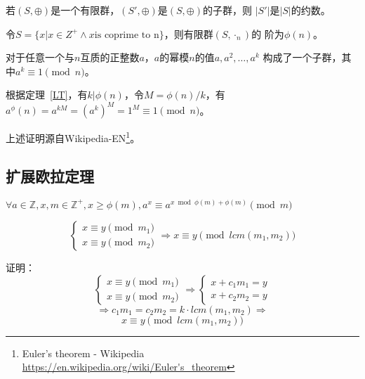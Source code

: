 \begin{theorem}\label{LT}
	若$(S,\oplus)$是一个有限群，$(S',\oplus)$是$(S,\oplus)$的子群，则
	$|S'|$是$|S|$的约数。
\end{theorem}

令$S=\{x|x\in Z^+ \land x \textrm{is coprime to n}\}$，则有限群$(S,\cdot_n)$的
阶为$\phi(n)$。

对于任意一个与$n$互质的正整数$a$，$a$的幂模$n$的值$a,a^2,\ldots,a^k$
构成了一个子群，其中$a^k\equiv 1 \pmod{n}$。

根据定理~\ref{LT}，有$k|\phi(n)$，令$M=\phi(n)/k$，有
$a^\phi(n)=a^{kM}=(a^k)^M=1^M\equiv 1 \pmod{n}$。

上述证明源自Wikipedia-EN\footnote{Euler's theorem - Wikipedia
	\url{https://en.wikipedia.org/wiki/Euler's_theorem}}。
\subsection{扩展欧拉定理}
\begin{theorem}\label{exEuler}
	$\forall a\in \mathbb{Z},x,m\in \mathbb{Z^+},x\geq \phi(m)
	,a^x\equiv a^{x \bmod \phi(m)+\phi(m)} \pmod{m}$
\end{theorem}

\begin{lemma}\label{EEL1}
	\begin{displaymath}
		\left\{
		\begin{array}{l}
			x\equiv y \pmod{m_1} \\
			x\equiv y \pmod{m_2}
		\end{array}
		\right.
		\Rightarrow x\equiv y \pmod{lcm(m_1,m_2)}
	\end{displaymath}
\end{lemma}

证明：
\begin{displaymath}
	\left\{
		\begin{array}{l}
			x\equiv y \pmod{m_1} \\
			x\equiv y \pmod{m_2}
		\end{array}
	\right.
	\Rightarrow
	\left\{
		\begin{array}{l}
			x+c_1m_1=y\\
			x+c_2m_2=y
		\end{array}
	\right.
\end{displaymath}
\begin{displaymath}
	\Rightarrow
	c_1m_1=c_2m_2=k\cdot lcm(m_1,m_2)
	\Rightarrow
\end{displaymath}
\begin{displaymath}
	x \equiv y \pmod{lcm(m_1,m_2)}
\end{displaymath}

